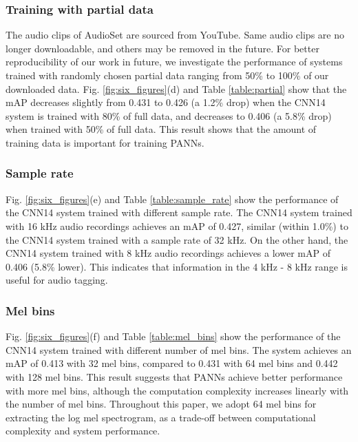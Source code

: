 \documentclass[journal]{IEEEtran}
\newcommand{\qk}[1] {{\color{black} #1}}
\begin{document}
\qk{\subsubsection{Training with partial data}
The audio clips of AudioSet are sourced from YouTube. Same audio clips are no longer downloadable, and others may be removed in the future. For better reproducibility of our work in future, we investigate the performance of systems trained with randomly chosen partial data ranging from 50\% to 100\% of our downloaded data. Fig. \ref{fig:six_figures}(d) and Table \ref{table:partial} show that the mAP decreases slightly from 0.431 to 0.426 (a 1.2\% drop) when the CNN14 system is trained with 80\% of full data, and decreases to 0.406 (a 5.8\% drop) when trained with 50\% of full data. This result shows that the amount of training data is important for training PANNs.

\subsubsection{Sample rate}
Fig. \ref{fig:six_figures}(e) and Table \ref{table:sample_rate} show the performance of the CNN14 system trained with different sample rate. The CNN14 system trained with 16 kHz audio recordings achieves an mAP of 0.427, similar (within 1.0\%) to the CNN14 system trained with a sample rate of 32 kHz. On the other hand, the CNN14 system trained with 8 kHz audio recordings achieves a lower mAP of 0.406 (5.8\% lower). This indicates that information in the 4 kHz - 8 kHz range is useful for audio tagging. 

\subsubsection{Mel bins}
Fig. \ref{fig:six_figures}(f) and Table \ref{table:mel_bins} show the performance of the CNN14 system trained with different number of mel bins. The system achieves an mAP of 0.413 with 32 mel bins, compared to 0.431 with 64 mel bins and 0.442 with 128 mel bins. This result suggests that PANNs achieve better performance with more mel bins, although the computation complexity increases linearly with the number of mel bins. Throughout this paper, we adopt 64 mel bins for extracting the log mel spectrogram, as a trade-off between computational complexity and system performance.}
\end{document}
